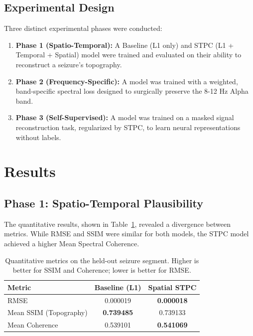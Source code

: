 \documentclass[11pt, a4paper]{article}
\begin{document}
\subsection{Experimental Design}
Three distinct experimental phases were conducted:
\begin{enumerate}
    \item \textbf{Phase 1 (Spatio-Temporal):} A Baseline (L1 only) and STPC (L1 + Temporal + Spatial) model were trained and evaluated on their ability to reconstruct a seizure's topography.
    \item \textbf{Phase 2 (Frequency-Specific):} A model was trained with a weighted, band-specific spectral loss designed to surgically preserve the 8-12 Hz Alpha band.
    \item \textbf{Phase 3 (Self-Supervised):} A model was trained on a masked signal reconstruction task, regularized by STPC, to learn neural representations without labels.
\end{enumerate}

\section{Results}
\subsection{Phase 1: Spatio-Temporal Plausibility}
The quantitative results, shown in Table~\ref{tab:metrics}, revealed a divergence between metrics. While RMSE and SSIM were similar for both models, the STPC model achieved a higher Mean Spectral Coherence.

\begin{table}[H]
    \centering
    \caption{Quantitative metrics on the held-out seizure segment. Higher is better for SSIM and Coherence; lower is better for RMSE.}
    \label{tab:metrics}
    \begin{tabular}{lcc}
        \toprule
        \textbf{Metric} & \textbf{Baseline (L1)} & \textbf{Spatial STPC} \\
        \midrule
        RMSE & 0.000019 & \textbf{0.000018} \\
        Mean SSIM (Topography) & \textbf{0.739485} & 0.739133 \\
        Mean Coherence & 0.539101 & \textbf{0.541069} \\
        \bottomrule
    \end{tabular}
\end{table}
\end{document}
